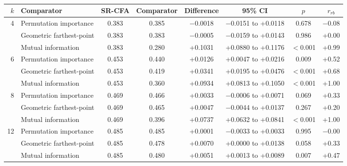 \begin{table}[htbp]
\centering
\small
\caption{}
\label{tab:selection_explor}
\setlength{\tabcolsep}{4pt}
\begin{adjustbox}{max width=\textwidth}
\begin{tabular}{rlcccccc}
\toprule
$k$ & Comparator & SR-CFA & Comparator & Difference & 95\% CI & $p$ & $r_{rb}$ \\
\midrule
4 & Permutation importance & 0.383 & 0.385 & $-$0.0018 & $-$0.0151 to +0.0118 & 0.678 & $-$0.08 \\
 & Geometric farthest-point & 0.383 & 0.383 & $-$0.0005 & $-$0.0159 to +0.0143 & 0.986 & +0.00 \\
 & Mutual information & 0.383 & 0.280 & +0.1031 & +0.0880 to +0.1176 & $<$0.001 & +0.99 \\
\midrule 6 & Permutation importance & 0.453 & 0.440 & +0.0126 & +0.0047 to +0.0216 & 0.009 & +0.52 \\
 & Geometric farthest-point & 0.453 & 0.419 & +0.0341 & +0.0195 to +0.0476 & $<$0.001 & +0.68 \\
 & Mutual information & 0.453 & 0.360 & +0.0934 & +0.0813 to +0.1050 & $<$0.001 & +1.00 \\
\midrule 8 & Permutation importance & 0.469 & 0.466 & +0.0033 & $-$0.0006 to +0.0071 & 0.069 & +0.33 \\
 & Geometric farthest-point & 0.469 & 0.465 & +0.0047 & $-$0.0044 to +0.0137 & 0.267 & +0.20 \\
 & Mutual information & 0.469 & 0.396 & +0.0737 & +0.0632 to +0.0841 & $<$0.001 & +1.00 \\
\midrule 12 & Permutation importance & 0.485 & 0.485 & +0.0001 & $-$0.0033 to +0.0033 & 0.995 & $-$0.00 \\
 & Geometric farthest-point & 0.485 & 0.478 & +0.0070 & +0.0000 to +0.0138 & 0.058 & +0.33 \\
 & Mutual information & 0.485 & 0.480 & +0.0051 & +0.0013 to +0.0089 & 0.007 & +0.47 \\
\bottomrule
\end{tabular}
\end{adjustbox}
\end{table}
